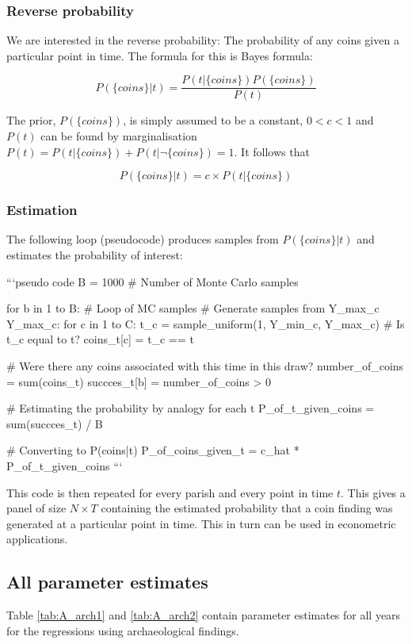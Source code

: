 \subsubsection{Reverse probability} 
We are interested in the reverse probability: The probability of any coins given a particular point in time. The formula for this is Bayes formula:

\begin{equation}
P(\{coins\}|t) = \frac{P(t|\{coins\})P(\{coins\})}{P(t)}
\end{equation}

The prior, $P(\{coins\})$, is simply assumed to be a constant, $0<c<1$ and $P(t)$ can be found by marginalisation  $P(t)=P(t|\{coins\})+P(t|\neg\{coins\})=1$. It follows that

\begin{equation}
P(\{coins\}|t) = c\times P(t|\{coins\})
\end{equation}

\subsubsection{Estimation}
The following loop (pseudocode) produces samples from $P(\{coins\}|t)$ and estimates the probability of interest:

```{pseudo code}
B = 1000 # Number of Monte Carlo samples

for b in 1 to B: # Loop of MC samples
	# Generate samples from Y_max_c Y_max_c:
	for c in 1 to C:
		t_c = sample_uniform(1, Y_min_c, Y_max_c)
		# Is t_c equal to t?
		coins_t[c] = t_c == t
		
	# Were there any coins associated with this time in this draw?
	number_of_coins = sum(coins_t)
	succces_t[b] = number_of_coins > 0
	
# Estimating the probability by analogy for each t
P_of_t_given_coins = sum(succces_t) / B

# Converting to P({coins}|t)
P_of_coins_given_t = c_hat * P_of_t_given_coins
```


This code is then repeated for every parish and every point in time $t$. This gives a panel of size $N\times T$ containing the estimated probability that a coin finding was generated at a particular point in time. This in turn can be used in econometric applications. 

\newpage
\subsection{All parameter estimates}
Table \ref{tab:A_arch1} and \ref{tab:A_arch2} contain parameter estimates for all years for the regressions using archaeological findings. 


